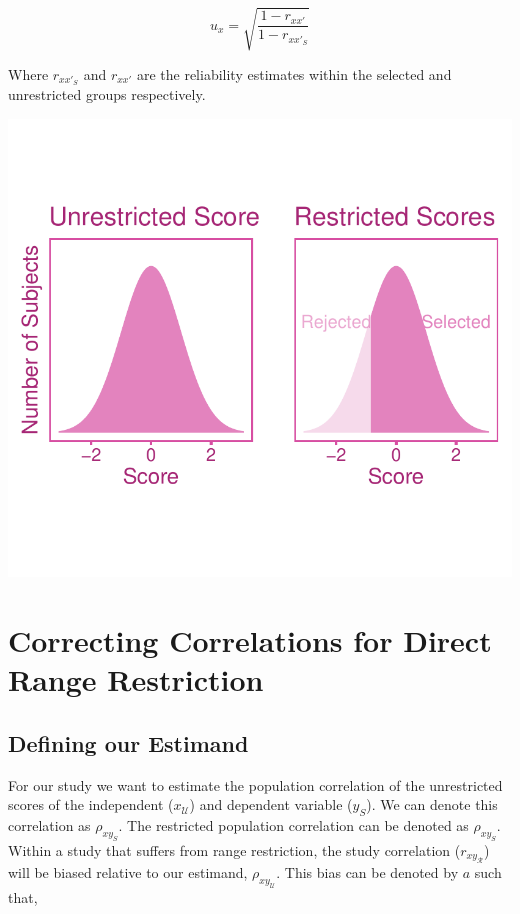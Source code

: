 \documentclass[
  letterpaper,
  DIV=11,
  numbers=noendperiod]{scrreprt}
\begin{document}
\[
u_x = \sqrt{\frac{1-r_{xx'}}{1-r_{xx'_S}}}
\]

Where \(r_{xx'_S}\) and \(r_{xx'}\) are the reliability estimates within
the selected and unrestricted groups respectively.

\includegraphics{direct_range_restriction_files/figure-pdf/unnamed-chunk-1-1.pdf}

\hypertarget{correcting-correlations-for-direct-range-restriction}{%
\section{Correcting Correlations for Direct Range
Restriction}\label{correcting-correlations-for-direct-range-restriction}}

\hypertarget{defining-our-estimand-7}{%
\subsection{Defining our Estimand}\label{defining-our-estimand-7}}

For our study we want to estimate the population correlation of the
unrestricted scores of the independent (\(x_\mathcal{U}\)) and dependent
variable (\(y_S\)). We can denote this correlation as \(\rho_{xy_S}\).
The restricted population correlation can be denoted as \(\rho_{xy_S}\).
Within a study that suffers from range restriction, the study
correlation (\(r_{xy_{\mathcal{R}}}\)) will be biased relative to our
estimand, \(\rho_{xy_{\mathcal{U}}}\). This bias can be denoted by \(a\)
such that,
\end{document}
